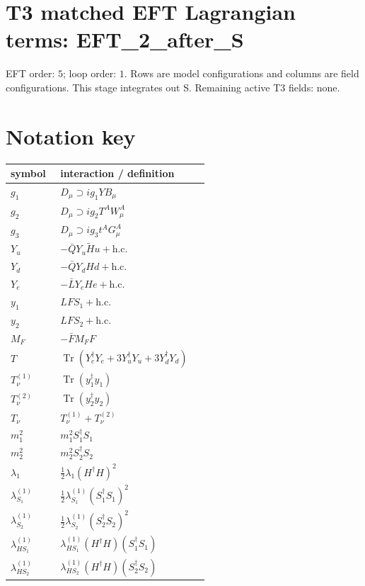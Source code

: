 \documentclass[8pt]{article}
\begin{document}
\begin{landscape}
\section*{T3 matched EFT Lagrangian terms: EFT\_2\_after\_S}
EFT order: $5$; loop order: $1$. 
Rows are model configurations and columns are field configurations. This stage integrates out S. Remaining active T3 fields: none.
\section*{Notation key}
\begin{longtable}{@{}p{0.23\linewidth}p{0.69\linewidth}@{}}
\toprule
symbol & interaction / definition \\
\midrule
$g_1$ & $D_\mu\supset i g_1YB_\mu$ \\
$g_2$ & $D_\mu\supset i g_2T^AW_\mu^A$ \\
$g_3$ & $D_\mu\supset i g_3t^AG_\mu^A$ \\
$Y_u$ & $-\bar QY_u\widetilde Hu+\mathrm{h.c.}$ \\
$Y_d$ & $-\bar QY_dHd+\mathrm{h.c.}$ \\
$Y_e$ & $-\bar LY_eHe+\mathrm{h.c.}$ \\
$y_1$ & $LFS_1+\mathrm{h.c.}$ \\
$y_2$ & $LFS_2+\mathrm{h.c.}$ \\
$M_F$ & $-\bar FM_FF$ \\
$T$ & $\operatorname{Tr}(Y_e^\dagger Y_e+3Y_u^\dagger Y_u+3Y_d^\dagger Y_d)$ \\
$T_\nu^{(1)}$ & $\operatorname{Tr}(y_1^\dagger y_1)$ \\
$T_\nu^{(2)}$ & $\operatorname{Tr}(y_2^\dagger y_2)$ \\
$T_\nu$ & $T_\nu^{(1)}+T_\nu^{(2)}$ \\
$m_1^2$ & $m_1^2S_1^\dagger S_1$ \\
$m_2^2$ & $m_2^2S_2^\dagger S_2$ \\
$\lambda_1$ & $\frac12\lambda_1(H^\dagger H)^2$ \\
$\lambda_{S_1}^{(1)}$ & $\frac12\lambda_{S_1}^{(1)}(S_1^\dagger S_1)^2$ \\
$\lambda_{S_2}^{(1)}$ & $\frac12\lambda_{S_2}^{(1)}(S_2^\dagger S_2)^2$ \\
$\lambda_{HS_1}^{(1)}$ & $\lambda_{HS_1}^{(1)}(H^\dagger H)(S_1^\dagger S_1)$ \\
$\lambda_{HS_2}^{(1)}$ & $\lambda_{HS_2}^{(1)}(H^\dagger H)(S_2^\dagger S_2)$ \\

\end{longtable}
\end{landscape}
\end{document}
